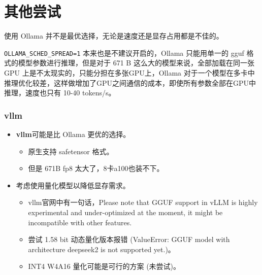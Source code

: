 \section{其他尝试}

\begin{frame}
    使用 Ollama 并不是最优选择，无论是速度还是显存占用都是不佳的。

    \texttt{OLLAMA\_SCHED\_SPREAD=1} 本来也是不建议开启的，Ollama 只能用单一的 gguf 格式的模型参数进行推理，但是对于 671 B 这么大的模型来说，全部加载在同一张 GPU 上是不太现实的，只能分担在多张GPU上，Ollama 对于一个模型在多卡中推理优化较差，这样做增加了GPU之间通信的成本，即使所有参数全部在GPU中推理，速度也只有 10-40 tokens/s。
\end{frame}

\begin{frame}
    \frametitle{vllm}
    \begin{itemize}
        \item \textbf{vllm}可能是比 Ollama 更优的选择。
              \begin{itemize}
                  \item 原生支持 safetensor 格式。
                  \item 但是 671B fp8 太大了，8卡a100也装不下。
              \end{itemize}

              \bigskip

        \item 考虑使用量化模型以降低显存需求。
              \begin{itemize}
                  \item vllm官网中有一句话，Please note that GGUF support in vLLM is highly experimental and under-optimized at the moment, it might be incompatible with other features.
                  \item 尝试 1.58 bit 动态量化版本报错 (ValueError: GGUF model with architecture deepseek2 is not supported yet.)。
                  \item INT4 W4A16 量化可能是可行的方案 (未尝试)。
              \end{itemize}
    \end{itemize}
\end{frame}

